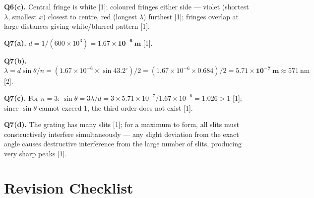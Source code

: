 \begin{markscheme}
\vspace{0.5em}\textbf{Q6(c).} Central fringe is white [1]; coloured fringes either side — violet (shortest $\lambda$, smallest $x$) closest to centre, red (longest $\lambda$) furthest [1]; fringes overlap at large distances giving white/blurred pattern [1].

\vspace{0.5em}\textbf{Q7(a).} $d = 1/(600\times10^3) = \mathbf{1.67\times10^{-6}\ \text{m}}$ [1].

\vspace{0.5em}\textbf{Q7(b).} $\lambda = d\sin\theta/n = (1.67\times10^{-6}\times\sin43.2^\circ)/2 = (1.67\times10^{-6}\times0.684)/2 = \mathbf{5.71\times10^{-7}\ \text{m}} \approx 571\ \text{nm}$ [2].

\vspace{0.5em}\textbf{Q7(c).} For $n=3$: $\sin\theta = 3\lambda/d = 3\times5.71\times10^{-7}/1.67\times10^{-6} = 1.026 > 1$ [1]; since $\sin\theta$ cannot exceed 1, the third order does not exist [1].

\vspace{0.5em}\textbf{Q7(d).} The grating has many slits [1]; for a maximum to form, all slits must constructively interfere simultaneously — any slight deviation from the exact angle causes destructive interference from the large number of slits, producing very sharp peaks [1].

\end{markscheme}

\newpage
\section{Revision Checklist}

